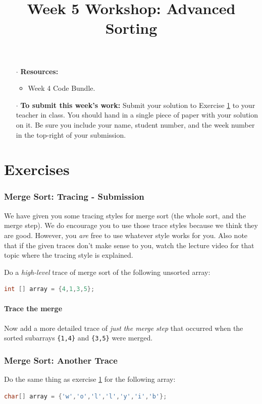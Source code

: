 \documentclass[twoside=false,DIV=14]{scrartcl}
\title{\color{redish} \vspace{-2em}Week 5 Workshop: Advanced Sorting}
\begin{document}
{\color{blackish}\maketitle}\vspace{-2em}%
\begin{itemize}
    \item[$\cdot$] {\bf Resources:}\begin{itemize}
    \item  Week 4  Code Bundle.
    \end{itemize}
    \item[$\cdot$] {\bf To submit this week's work:} Submit your solution to Exercise \ref{sec:submission} to your teacher in class.  You should hand in a single piece of paper with your solution on it.  Be sure you include your name, student number, and the week number in the top-right of your submission.
\end{itemize}

\part*{Exercises}

\section{Merge Sort: Tracing - Submission}
\label{sec:submission}
\begin{note}
We have given you some tracing styles for merge sort (the whole sort, and the merge step).  We do encourage you to use those trace styles because we think they are good. However, you \emph{are} free to use whatever style works for you.  Also note that if the given traces don't make sense to you, watch the lecture video for that topic where the tracing style is explained.
\end{note}
Do a \emph{high-level} trace of merge sort of the following unsorted array:
\begin{lstlisting}[language=java]
int [] array = {4,1,3,5};
\end{lstlisting}
\subsection{Trace the merge}
Now add a more detailed trace of \emph{just the merge step} that occurred when the sorted subarrays \verb|{1,4}| and \verb|{3,5}| were merged.

\section{Merge Sort: Another Trace}
Do the same thing as exercise \ref{sec:submission} for the following array:
\begin{lstlisting}[language=java]
char[] array = {'w','o','l','l','y','i','b'};
\end{lstlisting}
\end{document}
